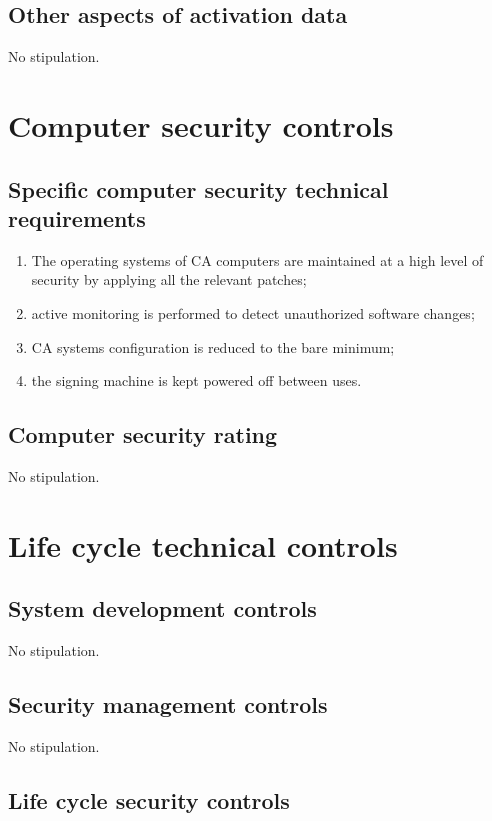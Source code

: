 \documentclass[11pt,a4paper,titlepage]{book}
\begin{document}
\subsection{Other aspects of activation data}

No stipulation.

\section{Computer security controls}
\subsection{Specific computer security technical requirements}

\begin{enumerate}
\item{The operating systems of CA computers are maintained at a high level of security by applying all the relevant patches;}
\item{active monitoring is performed to detect unauthorized software changes;}
\item{CA systems configuration is reduced to the bare minimum;}
\item{the signing machine is kept powered off between uses.}
\end{enumerate}

\subsection{Computer security rating}

No stipulation.

\section{Life cycle technical controls}
\subsection{System development controls}

No stipulation.

\subsection{Security management controls}

No stipulation.

\subsection{Life cycle security controls}
\end{document}

